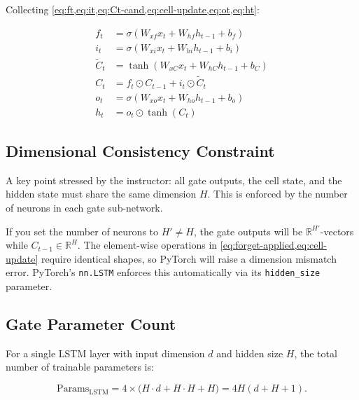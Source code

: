 \documentclass[12pt,a4paper]{article}
\newcommand{\R}{\mathbb{R}}
\begin{document}
Collecting \cref{eq:ft,eq:it,eq:Ct-cand,eq:cell-update,eq:ot,eq:ht}:

\begin{align}
  f_t         &= \sigma(W_{xf}x_t + W_{hf}h_{t-1} + b_f) \label{eq:full-ft} \\
  i_t         &= \sigma(W_{xi}x_t + W_{hi}h_{t-1} + b_i) \label{eq:full-it} \\
  \tilde{C}_t &= \tanh(W_{xC}x_t + W_{hC}h_{t-1} + b_C) \label{eq:full-Ct} \\
  C_t         &= f_t \odot C_{t-1} + i_t \odot \tilde{C}_t \label{eq:full-cell} \\
  o_t         &= \sigma(W_{xo}x_t + W_{ho}h_{t-1} + b_o) \label{eq:full-ot} \\
  h_t         &= o_t \odot \tanh(C_t) \label{eq:full-ht}
\end{align}

\subsection{Dimensional Consistency Constraint}
\label{subsec:dim-constraint}

A key point stressed by the instructor: all gate outputs, the cell state,
and the hidden state must share the same dimension $H$.  This is enforced by
the number of neurons in each gate sub-network.

\begin{warningbox}[title=Dimension Mismatch Will Break the Forward Pass]
  If you set the number of neurons to $H' \neq H$, the gate outputs will be
  $\R^{H'}$-vectors while $C_{t-1} \in \R^H$.  The element-wise operations
  in \cref{eq:forget-applied,eq:cell-update} require identical shapes, so
  PyTorch will raise a dimension mismatch error.  PyTorch's \texttt{nn.LSTM}
  enforces this automatically via its \texttt{hidden\_size} parameter.
\end{warningbox}

\subsection{Gate Parameter Count}
\label{subsec:param-count}

For a single LSTM layer with input dimension $d$ and hidden size $H$,
the total number of trainable parameters is:

\begin{equation}
  \text{Params}_{\text{LSTM}} = 4 \times \bigl(H \cdot d + H \cdot H + H\bigr)
  = 4H(d + H + 1).
  \label{eq:param-count}
\end{equation}
\end{document}
